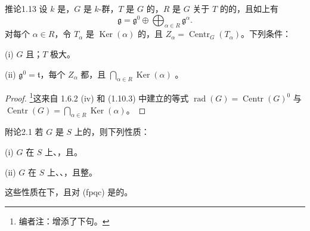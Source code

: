 \begin{SGAresult}{推论}{1.13}
设 $k$ 是，$G$ 是 $k$-群，$T$ 是 $G$ 的，$R$ 是 $G$ 关于 $T$ 的的，且如上有
\[
\mathfrak g=\mathfrak g^0\oplus\bigoplus_{\alpha\in R}\mathfrak g^\alpha.
\]
对每个 $\alpha\in R$，令 $T_\alpha$ 是 $\operatorname{Ker}(\alpha)$ 的，且 $Z_\alpha=\operatorname{Centr}_G(T_\alpha)$。下列条件：

(i) $G$ 且；$T$ 极大。

(ii) $\mathfrak g^0=\mathfrak t$，每个 $Z_\alpha$ 都，且 $\bigcap_{\alpha\in R}\operatorname{Ker}(\alpha)$ 。
\end{SGAresult}
\begin{proof}
\footnote[13]{编者注：增添了下句。}这来自 1.6.2 (iv) 和 (1.10.3) 中建立的等式 $\operatorname{rad}(G)=\operatorname{Centr}(G)^0$ 与 $\operatorname{Centr}(G)=\bigcap_{\alpha\in R}\operatorname{Ker}(\alpha)$。
\end{proof}
\begin{SGAresult}{附论}{2.1}
若 $G$ 是 $S$ 上的，则下列性质：

(i) $G$ 在 $S$ 上、，且。

(ii) $G$ 在 $S$ 上、、，且整。

这些性质在下，且对 (fpqc) 是的。
\end{SGAresult}
